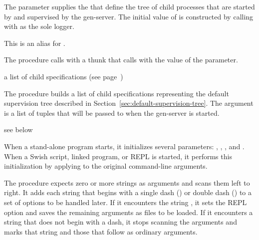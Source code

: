 The  parameter supplies the 
that define the tree of child processes that are started by
 and supervised by the  gen-server.
The initial value of  is constructed by calling
 with  as the
sole logger.

\begin{syntax}
\end{syntax}

This is an alias for .

\begin{procedure}
\end{procedure}
\returns{} 

The  procedure calls 
with a  thunk that calls 
with the value of the  parameter.

\begin{procedure}
\end{procedure}
\returns{} a list of child specifications (see page~\pageref{page:child-spec})

The  procedure builds a list of child specifications
representing the default supervision tree described in
Section~\ref{sec:default-supervision-tree}.
The  argument is a list of  tuples that will
be passed to  when the  gen-server is started.

\begin{procedure}
\end{procedure}
\returns{} see below

When a stand-alone program starts, it initializes several parameters:
, , , and
.
When a Swish script, linked program, or REPL is started, it performs this
initialization by applying  to the original command-line
arguments.

The  procedure expects zero or more strings as arguments
and scans them left to right.
It adds each string that begins with a single dash (\sopt{}) or double dash
(\lopt{}) to a set of options to be handled later.
If it encounters the string \str{\lopt{}}, it sets the REPL option and
saves the remaining arguments as files to be loaded.
If it encounters a string that does not begin with a dash, it stops scanning
the arguments and marks that string and those that follow as ordinary
arguments.

